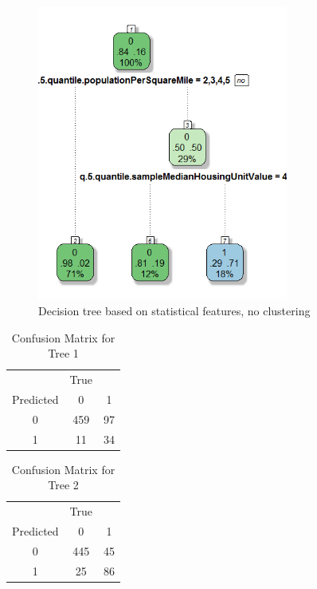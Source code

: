\documentclass[conference,compsoc]{IEEEtran}
\begin{document}
\begin{figure}[!t]
\centering
\includegraphics[width=3.25in]{decision-tree-02-cluster-3.png}
\caption{Decision tree based on statistical features, no clustering}
\label{decision.tree.02.3}
\end{figure}


\begin{table}[!t]
\renewcommand{\arraystretch}{1.3}
\caption{Confusion Matrix for Tree 1}
\label{table.confusion.matrix.01}
\centering
\begin{tabular}{ccc}
\hline
 & True &  \\
Predicted & 0 & 1 \\
0 & 459 & 97 \\
1 & 11 & 34 \\
\hline
\end{tabular}
\end{table}

\begin{table}[!t]
\renewcommand{\arraystretch}{1.3}
\caption{Confusion Matrix for Tree 2}
\label{table.confusion.matrix.02}
\centering
\begin{tabular}{ccc}
\hline
 & True &  \\
Predicted & 0 & 1 \\
0 & 445 & 45 \\
1 & 25 & 86 \\
\hline
\end{tabular}
\end{table}
\end{document}
